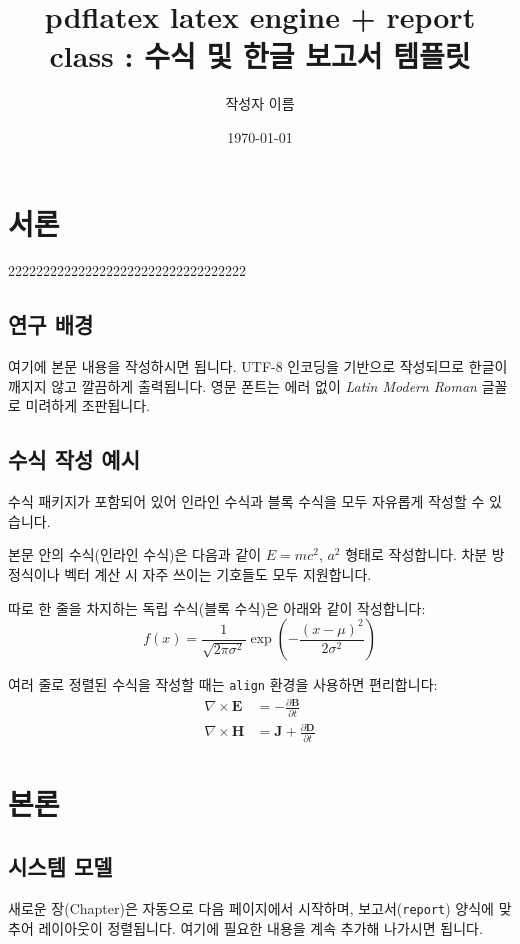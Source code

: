 \documentclass[11pt, a4paper]{report}
\title{pdflatex latex engine + report class :  수식 및 한글 보고서 템플릿}
\author{작성자 이름}
\date{\today}
\begin{document}
\maketitle

\tableofcontents
\newpage

\chapter{서론}
2222222222222222222222222222222222
\section{연구 배경}
여기에 본문 내용을 작성하시면 됩니다. UTF-8 인코딩을 기반으로 작성되므로 한글이 깨지지 않고 깔끔하게 출력됩니다. 영문 폰트는 에러 없이 \textit{Latin Modern Roman} 글꼴로 미려하게 조판됩니다.

\section{수식 작성 예시}
수식 패키지가 포함되어 있어 인라인 수식과 블록 수식을 모두 자유롭게 작성할 수 있습니다.

본문 안의 수식(인라인 수식)은 다음과 같이 $E = mc^2$, \( a^2 \)  형태로 작성합니다. 차분 방정식이나 벡터 계산 시 자주 쓰이는 기호들도 모두 지원합니다.

따로 한 줄을 차지하는 독립 수식(블록 수식)은 아래와 같이 작성합니다:
\begin{equation}
    f(x) = \frac{1}{\sqrt{2\pi\sigma^2}} \exp\left( -\frac{(x-\mu)^2}{2\sigma^2} \right)
\end{equation}

여러 줄로 정렬된 수식을 작성할 때는 \texttt{align} 환경을 사용하면 편리합니다:
\begin{align}
    \nabla \times \mathbf{E} &= -\frac{\partial \mathbf{B}}{\partial t} \\
    \nabla \times \mathbf{H} &= \mathbf{J} + \frac{\partial \mathbf{D}}{\partial t}
\end{align}


\chapter{본론}
\section{시스템 모델}
새로운 장(Chapter)은 자동으로 다음 페이지에서 시작하며, 보고서(\texttt{report}) 양식에 맞추어 레이아웃이 정렬됩니다. 여기에 필요한 내용을 계속 추가해 나가시면 됩니다.
\end{document}
